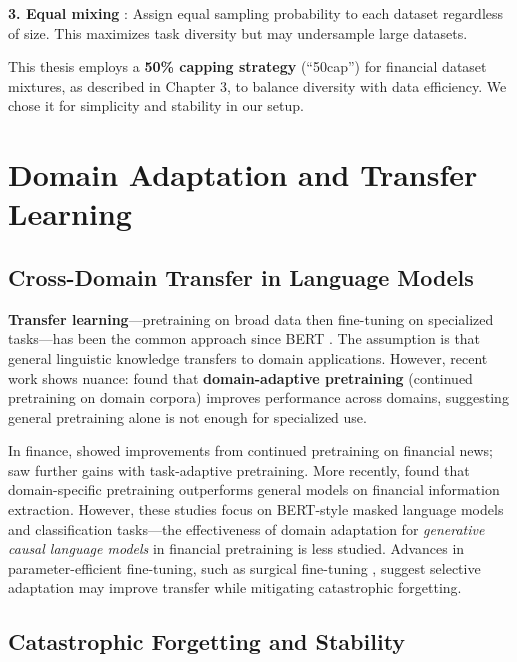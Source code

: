 \textbf{3. Equal mixing} \parencite{sanh2022multitask}: Assign equal sampling probability to each dataset regardless of size. This maximizes task diversity but may undersample large datasets.

This thesis employs a \textbf{50\% capping strategy} (``50cap'') for financial dataset mixtures, as described in Chapter 3, to balance diversity with data efficiency. We chose it for simplicity and stability in our setup.

\section{Domain Adaptation and Transfer Learning}

\subsection{Cross-Domain Transfer in Language Models}

\textbf{Transfer learning}—pretraining on broad data then fine-tuning on specialized tasks—has been the common approach since BERT \parencite{devlin2019bert,pan2010transfer,zhuang2020comprehensive}. The assumption is that general linguistic knowledge transfers to domain applications. However, recent work shows nuance: \textcite{gururangan2020don} found that \textbf{domain-adaptive pretraining} (continued pretraining on domain corpora) improves performance across domains, suggesting general pretraining alone is not enough for specialized use.

In finance, \textcite{araci2019finbert} showed improvements from continued pretraining on financial news; \textcite{yang2020finbert} saw further gains with task-adaptive pretraining. More recently, \textcite{huang2023finbert} found that domain-specific pretraining outperforms general models on financial information extraction. However, these studies focus on BERT-style masked language models and classification tasks—the effectiveness of domain adaptation for \textit{generative causal language models} in financial pretraining is less studied. Advances in parameter-efficient fine-tuning, such as surgical fine-tuning \parencite{lee2022surgical}, suggest selective adaptation may improve transfer while mitigating catastrophic forgetting.

\subsection{Catastrophic Forgetting and Stability}

